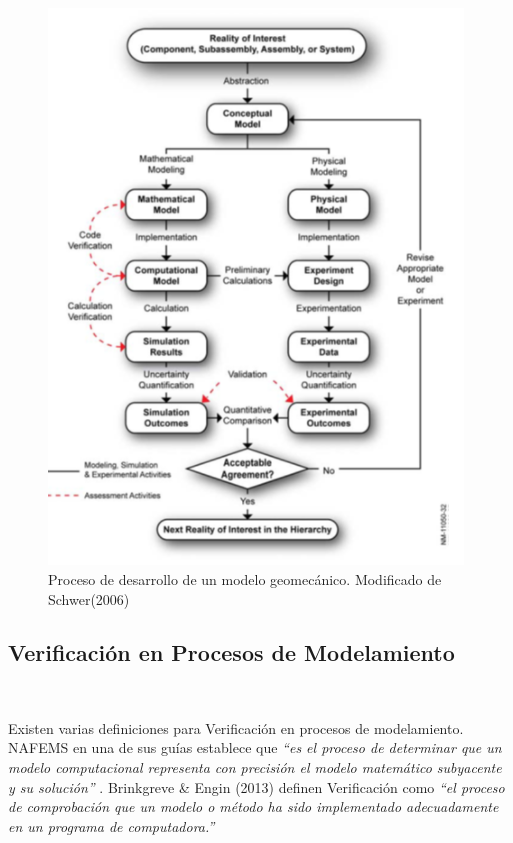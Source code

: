 \begin{figure}[!ht]
\centering
\includegraphics[width=11cm]{Imagenes/Kap_03/Desarrollo_modelo_geomecanico.png}
\caption[Proceso de desarrollo de un modelo geomecánico]{Proceso de desarrollo de un modelo geomecánico. Modificado de Schwer(2006) \cite{Schwer2006GuideMechanics}}
\label{fig:fig22}
\end{figure}


\subsection{Verificación en Procesos de Modelamiento}~\hypertarget{sec:sec232}{}
\label{sec:sec232}

Existen varias definiciones para Verificación en procesos de modelamiento. NAFEMS en una de sus guías establece que \textit{“es el proceso de determinar que un modelo computacional representa con precisión el modelo matemático subyacente y su solución”} \cite{Schwer2006GuideMechanics}. Brinkgreve \& Engin (2013) \cite{R.B.J.2013ValidationAnalysis} definen Verificación como \textit{“el proceso de comprobación que un modelo o método ha sido implementado adecuadamente en un programa de computadora.”}\bigskip

